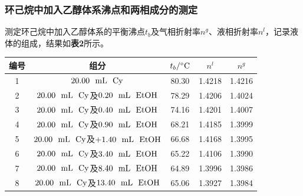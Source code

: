 \documentclass[12pt]{article}
\begin{document}
\subsubsection{环己烷中加入乙醇体系沸点和两相成分的测定}
测定环己烷中加入乙醇体系的平衡沸点$t_{b}$及气相折射率$n^{g}$、液相折射率$n^{l}$，记录液体的组成，结果如\textbf{表2}所示。
\begin{table}[h]
	\centering
	\begin{tabular}{ccccc}
		\toprule
		编号 & 组分 & $t_{b}/{\rm ^{\circ}C}$& $n^{l}$ & $n^{g}$ \\
		\midrule
		1 & $20.00\ \ {\rm mL\ \ } \ce{Cy}$ & 80.30 & 1.4218 & 1.4216 \\
		2 & $20.00\ \ {\rm mL\ \ } \ce{Cy}$及$0.20\ \ {\rm mL\ \ } \ce{EtOH}$  & 78.29 & 1.4206 & 1.4024 \\
		3 & $20.00\ \ {\rm mL\ \ } \ce{Cy}$及$0.40\ \ {\rm mL\ \ } \ce{EtOH}$  & 74.16 & 1.4201 & 1.4007 \\
		4 & $20.00\ \ {\rm mL\ \ } \ce{Cy}$及$0.90\ \ {\rm mL\ \ } \ce{EtOH}$  & 68.21 & 1.4185 & 1.3999 \\
		5 & $20.00\ \ {\rm mL\ \ } \ce{Cy}$及$+1.40\ \ {\rm mL\ \ } \ce{EtOH}$  & 66.68 & 1.4168 & 1.3995 \\
		6 & $20.00\ \ {\rm mL\ \ } \ce{Cy}$及$3.40\ \ {\rm mL\ \ } \ce{EtOH}$  & 65.22 & 1.4106 & 1.3990 \\
		7 & $20.00\ \ {\rm mL\ \ } \ce{Cy}$及$8.40\ \ {\rm mL\ \ } \ce{EtOH}$  & 64.89 & 1.3996 & 1.3986 \\
		8 & $20.00\ \ {\rm mL\ \ } \ce{Cy}$及$13.40\ \ {\rm mL\ \ } \ce{EtOH}$  & 65.06 & 1.3927 & 1.3984 \\
		\bottomrule
	\end{tabular}
\end{table}
\par
\end{document}
